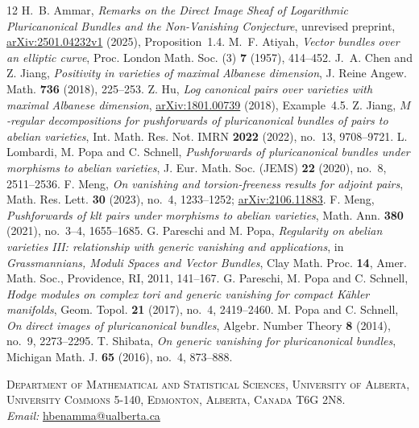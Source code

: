 \documentclass[11pt,letterpaper]{article}
\theoremstyle{paper}
\begin{document}
\begin{thebibliography}{12}
 H.~B. Ammar, \textit{Remarks on the Direct Image Sheaf of Logarithmic Pluricanonical Bundles and the Non-Vanishing Conjecture}, unrevised preprint, \href{https://arxiv.org/abs/2501.04232v1}{arXiv:2501.04232v1} (2025), Proposition~1.4.
 M.~F. Atiyah, \textit{Vector bundles over an elliptic curve}, Proc. London Math. Soc. (3) \textbf{7} (1957), 414--452.
 J.~A. Chen and Z. Jiang, \textit{Positivity in varieties of maximal Albanese dimension}, J. Reine Angew. Math. \textbf{736} (2018), 225--253.
 Z. Hu, \textit{Log canonical pairs over varieties with maximal Albanese dimension}, \href{https://arxiv.org/abs/1801.00739}{arXiv:1801.00739} (2018), Example~4.5.
 Z. Jiang, \textit{$M$-regular decompositions for pushforwards of pluricanonical bundles of pairs to abelian varieties}, Int. Math. Res. Not. IMRN \textbf{2022} (2022), no.~13, 9708--9721.
 L. Lombardi, M. Popa and C. Schnell, \textit{Pushforwards of pluricanonical bundles under morphisms to abelian varieties}, J. Eur. Math. Soc. (JEMS) \textbf{22} (2020), no.~8, 2511--2536.
 F. Meng, \textit{On vanishing and torsion-freeness results for adjoint pairs}, Math. Res. Lett. \textbf{30} (2023), no.~4, 1233--1252; \href{https://arxiv.org/abs/2106.11883}{arXiv:2106.11883}.
 F. Meng, \textit{Pushforwards of klt pairs under morphisms to abelian varieties}, Math. Ann. \textbf{380} (2021), no.~3--4, 1655--1685.
 G. Pareschi and M. Popa, \textit{Regularity on abelian varieties III: relationship with generic vanishing and applications}, in \textit{Grassmannians, Moduli Spaces and Vector Bundles}, Clay Math. Proc. \textbf{14}, Amer. Math. Soc., Providence, RI, 2011, 141--167.
 G. Pareschi, M. Popa and C. Schnell, \textit{Hodge modules on complex tori and generic vanishing for compact K\"ahler manifolds}, Geom. Topol. \textbf{21} (2017), no.~4, 2419--2460.
 M. Popa and C. Schnell, \textit{On direct images of pluricanonical bundles}, Algebr. Number Theory \textbf{8} (2014), no.~9, 2273--2295.
 T. Shibata, \textit{On generic vanishing for pluricanonical bundles}, Michigan Math. J. \textbf{65} (2016), no.~4, 873--888.
\end{thebibliography}

\bigskip
\noindent\textsc{Department of Mathematical and Statistical Sciences, University of Alberta,\\
University Commons 5-140, Edmonton, Alberta, Canada T6G 2N8.}\\
\textit{Email:} \href{mailto:hbenamma@ualberta.ca}{hbenamma@ualberta.ca}
\end{document}
